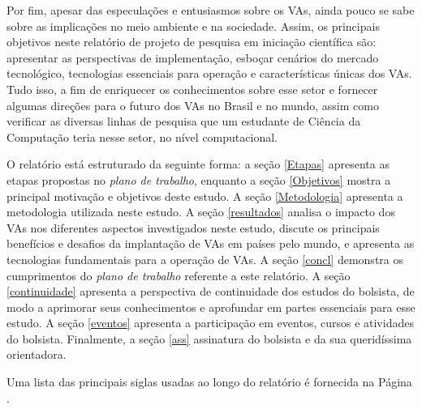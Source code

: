 \documentclass[
	12pt,				%
	openany, %
	a4paper,			%
	english,			%
	french,				%
	spanish,			%
	brazil				%
	]{abntex2}
\begin{document}
Por fim, apesar das especulações e entusiasmos sobre os VAs, ainda pouco se sabe sobre as implicações no meio ambiente e na sociedade. Assim, os principais objetivos neste relatório de projeto de pesquisa em iniciação científica são: apresentar as perspectivas de implementação, esboçar cenários do mercado tecnológico, tecnologias essenciais para operação e características únicas dos VAs. Tudo isso, a fim de enriquecer os conhecimentos sobre esse setor e fornecer algumas direções para o futuro dos VAs no Brasil e no mundo, assim como verificar as diversas linhas de pesquisa que um estudante de Ciência da Computação teria nesse setor, no nível computacional.

O relatório está estruturado da seguinte forma: a seção \ref{Etapas} apresenta as etapas propostas no \textit{plano de trabalho}, enquanto a seção \ref{Objetivos} mostra a principal motivação e objetivos deste estudo. A seção \ref{Metodologia} apresenta a metodologia utilizada neste estudo. A seção \ref{resultados} analisa o impacto dos VAs nos diferentes aspectos investigados neste estudo, discute os principais benefícios e desafios da implantação de VAs em países pelo mundo, e apresenta as tecnologias fundamentais para a operação de VAs. A seção \ref{concl} demonstra os cumprimentos do \textit{plano de trabalho} referente a este relatório. A seção \ref{continuidade} apresenta a perspectiva de continuidade dos estudos do bolsista, de modo a aprimorar seus conhecimentos e aprofundar em partes essenciais para esse estudo. A seção \ref{eventos} apresenta a participação em eventos, cursos e atividades do bolsista. Finalmente, a seção \ref{ass} assinatura do bolsista e da sua queridíssima orientadora.


Uma lista das principais siglas usadas ao longo do relatório é fornecida na Página \pageref{eq:1}.





%




\end{document}
